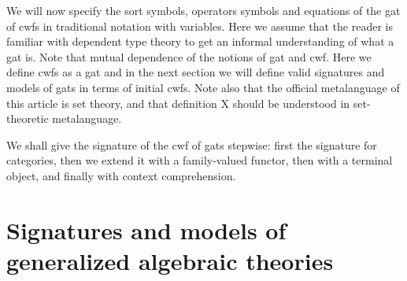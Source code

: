 \documentclass{lmcs}
\begin{document}
{We will now specify the sort symbols, operators symbols and equations of the gat of cwfs in traditional notation with variables. Here we assume that the reader is familiar with dependent type theory to get an informal understanding of what a gat is. Note that mutual dependence of the notions of gat and cwf. Here we define cwfs as a gat and in the next section we will define valid signatures and models of gats in terms of initial cwfs. Note also that the official metalanguage of this article is set theory, and that definition X should be understood in set-theoretic metalanguage.

We shall give the signature of the cwf of gats stepwise: first the signature for categories, then we extend it with a family-valued functor, then with a terminal object, and finally with context comprehension.
}

\section{Signatures and models of generalized algebraic theories}
\end{document}

